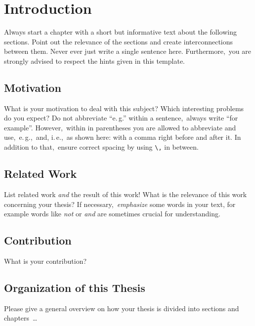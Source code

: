 \chapter{Introduction} \label{chap:intro}
Always start a chapter with a short but informative text about the following sections\@. Point out the relevance of the sections and create interconnections between them\@. Never ever just write a single sentence here\@. Furthermore,\ you are strongly advised to respect the hints given in this template\@.

\section{Motivation}
What is your motivation to deal with this subject\@? Which interesting problems do you expect\@? Do not abbreviate \enquote{e.\,g.\/} within a sentence,\ always write \enquote{for example}\@. However,\ within in parentheses you are allowed to abbreviate and use,\ e.\,g.,\ and, i.\,e.,\ as shown here: with a comma right before and after it\@. In addition to that,\ ensure correct spacing by using \texttt{\textbackslash,} in between\@.

\section{Related Work}
List related work \emph{and} the result of this work\@! What is the relevance of this work concerning your thesis\@? If necessary,\ \emph{emphasize} some words in your text, for example words like \emph{not} or \emph{and} are sometimes crucial for understanding\@.

\section{Contribution}
What is your contribution?

\section{Organization of this Thesis}
Please give a general overview on how your thesis is divided into sections and chapters~\dots

